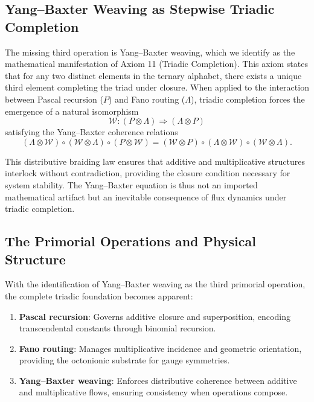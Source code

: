 \documentclass[pdflatex,sn-mathphys-num]{sn-jnl}
\theoremstyle{thmstyleone}
\theoremstyle{thmstyletwo}
\theoremstyle{thmstylethree}
\begin{document}
\subsection{Yang--Baxter Weaving as Stepwise Triadic Completion}

The missing third operation is Yang--Baxter weaving, which we identify as the mathematical manifestation of Axiom 11 (Triadic Completion). This axiom states that for any two distinct elements in the ternary alphabet, there exists a unique third element completing the triad under closure. When applied to the interaction between Pascal recursion ($P$) and Fano routing ($\Lambda$), triadic completion forces the emergence of a natural isomorphism
\begin{equation}
\mathcal{W}: (P \otimes \Lambda) \Rightarrow (\Lambda \otimes P)
\end{equation}
satisfying the Yang--Baxter coherence relations
\begin{equation}
(\Lambda \otimes \mathcal{W}) \circ (\mathcal{W} \otimes \Lambda) \circ (P \otimes \mathcal{W}) = (\mathcal{W} \otimes P) \circ (\Lambda \otimes \mathcal{W}) \circ (\mathcal{W} \otimes \Lambda).
\end{equation}

This distributive braiding law ensures that additive and multiplicative structures interlock without contradiction, providing the closure condition necessary for system stability. The Yang--Baxter equation is thus not an imported mathematical artifact but an inevitable consequence of flux dynamics under triadic completion.

\subsection{The Primorial Operations and Physical Structure}

With the identification of Yang--Baxter weaving as the third primorial operation, the complete triadic foundation becomes apparent:

\begin{enumerate}
\item \textbf{Pascal recursion}: Governs additive closure and superposition, encoding transcendental constants through binomial recursion.
\item \textbf{Fano routing}: Manages multiplicative incidence and geometric orientation, providing the octonionic substrate for gauge symmetries.
\item \textbf{Yang--Baxter weaving}: Enforces distributive coherence between additive and multiplicative flows, ensuring consistency when operations compose.
\end{enumerate}
\end{document}
